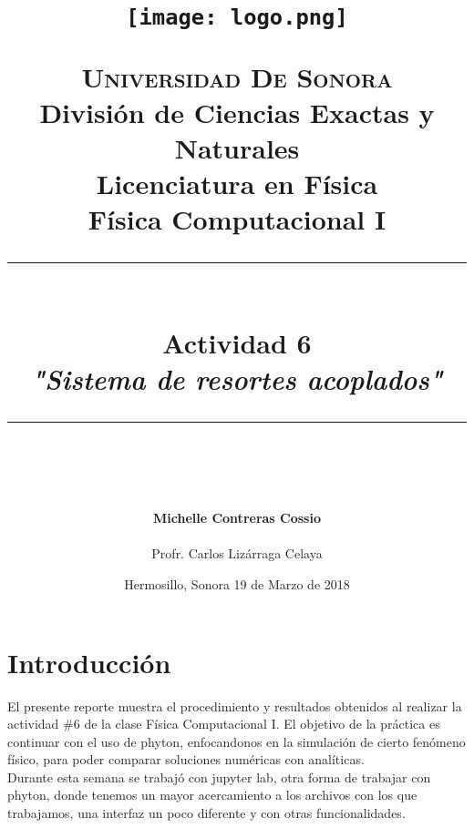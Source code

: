 \documentclass[12pt]{article}
\newcommand{\HRule}[1]{\rule{\linewidth}{#1}}
\begin{document}
\begin{titlepage}

\title{ \normalsize 
        \begin{center}
        \texttt{[image: logo.png]}
        \end{center}
        \LARGE \textsc{\textbf{Universidad De Sonora}} \\ \bigskip
		\Large División de Ciencias Exactas y Naturales \\
        Licenciatura en Física \\ \bigskip
        \bigskip
        Física Computacional I
		\\ [0.1cm]  
		\HRule{2pt} \\
		\Large \textbf{{Actividad 6}} \\
        \textit{\textbf{"Sistema de resortes acoplados"}}
		\HRule{2pt} \\
		\normalsize \vspace*{0.001\baselineskip}}
        
\date{\bigskip \Large Hermosillo, Sonora  \hspace*{\fill}  19 de Marzo de 2018}

        
\author{
		\Large\textbf{ Michelle Contreras Cossio} \\ \bigskip
        \\ \bigskip
       \Large Profr. Carlos Lizárraga Celaya}
       \end{titlepage}
       \maketitle
       

\newpage
\pagestyle{plain}

\section{Introducción}
El presente reporte muestra el procedimiento y resultados obtenidos al realizar la actividad \#6 de la clase Física Computacional I. El objetivo de la práctica es continuar con el uso de phyton, enfocandonos en la simulación de cierto fenómeno físico, para poder comparar soluciones numéricas con analíticas. \\

Durante esta semana se trabajó con jupyter lab, otra forma de trabajar con phyton, donde tenemos un mayor acercamiento a los archivos con los que trabajamos, una interfaz un poco diferente y con otras funcionalidades. \\
\end{document}
